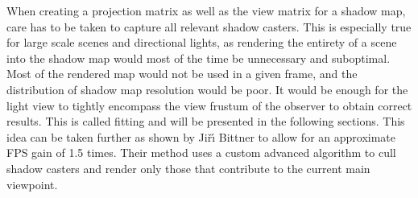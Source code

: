 When creating a projection matrix as well as the view matrix for a shadow map, care has to be taken to capture all relevant shadow casters. This is especially true for large scale scenes and directional lights, as rendering the entirety of a scene into the shadow map would most of the time be unnecessary and suboptimal. Most of the rendered map would not be used in a given frame, and the distribution of shadow map resolution would be poor. It would be enough for the light view to tightly encompass the view frustum of the observer to obtain correct results. This is called fitting and will be presented in the following sections. This idea can be taken further as shown by Ji\v{r}\'{\i} Bittner \cite{bib:proc:bittner_caster_culling} to allow for an approximate FPS gain of 1.5 times. Their method uses a custom advanced algorithm to cull shadow casters and render only those that contribute to the current main viewpoint.

